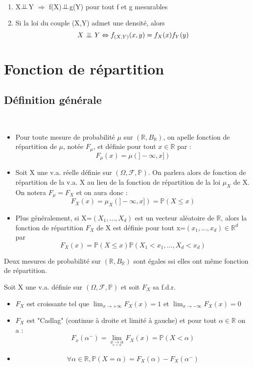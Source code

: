 \begin{Prop} \
\begin{enumerate}
\item X$\perp \! \! \! \perp$Y $\Rightarrow$ f(X)$\perp \! \! \! \perp$g(Y) pour tout f et g mesurables
\item Si la loi du couple (X,Y) admet une densité, alors \[X\perp \! \! \! \perp Y \Leftrightarrow f_{(X,Y)}(x,y)=f_X (x) f_Y (y)\]
\end{enumerate}
\end{Prop}

\section{Fonction de répartition}
\subsection{Définition générale}
\begin{Def} \
\begin{itemize}
\item Pour toute mesure de probabilité $\mu$ sur $(\mathbb{R},B_{\mathbb{R}})$, on apelle fonction de répartition de $\mu$, notée $F_{\mu}$, et définie pour tout $x\in \mathbb{R}$ par : \[F_{\mu}(x)=\mu(]-\infty, x])\]
\item Soit X une v.a. réelle définie sur $(\Omega, \mathcal{F}, \mathbb{P})$. On parlera alors de fonction de répartition de la v.a. X au lieu de la fonction de répartition de la loi $\mu_X$ de X. On notera $F_{\mu} = F_X$ et on aura donc : \[F_X(x) = \mu_X (]-\infty,x])=\mathbb{P}(X \leq x)\]
\item Plus généralement, si X=$(X_1,...,X_d)$ est un vecteur aléatoire de $\mathbb{R}$, alors la fonction de répartition $F_X$ de X est définie pour tout x=$(x_1,...,x_d)\in \mathbb{R}^d$ par \[F_X(x)=\mathbb{P}(X \leq x) \mathbb{P}(X_1<x_1,...,X_d<x_d)\]
\end{itemize}
\end{Def}

\begin{theo}[admis]
Deux mesures de probabilité sur $(\mathbb{R}, B_{\mathbb{R}})$ sont égales ssi elles ont même fonction de répartition.
\end{theo}

\begin{Prop}[de la f.d.r]
Soit X une v.a. définie sur $(\Omega,\mathcal{F},\mathbb{P})$ et soit $F_X$ sa f.d.r.
\begin{itemize}
\item $F_X$ est croissante tel que $\lim_{x \to +\infty} F_X(x)=1$ et $\lim_{x \to -\infty} F_X(x)=0$
\item $F_X$ est "Cadlag" (continue à droite et limité à gauche) et pour tout $\alpha\in\mathbb{R}$ on a : \[F_x(\alpha^{-})=\lim_{\underset{x<\alpha}{x \to \alpha}} F_X(x) = \mathbb{P}(X<\alpha)\]
\item \[\forall \alpha \in \mathbb{R}, \mathbb{P}(X=\alpha)=F_X(\alpha) - F_X (\alpha^{-})\]
\end{itemize}
\end{Prop}

